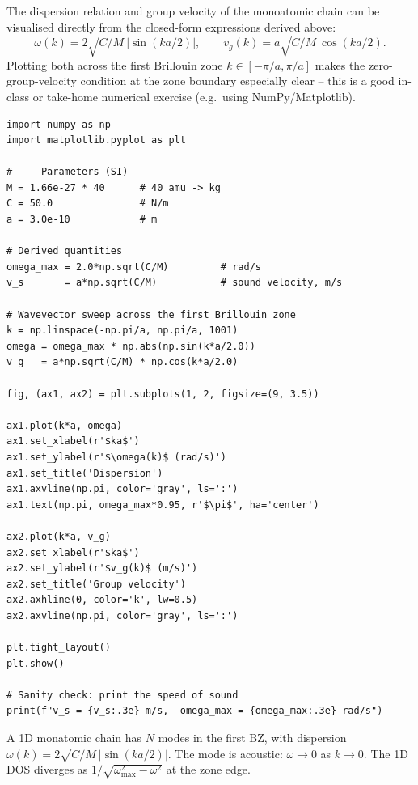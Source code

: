 \documentclass[11pt,a4paper]{article}
\begin{document}
The dispersion relation and group velocity of the monoatomic chain can be visualised
directly from the closed-form expressions derived above:
\[
\omega(k)=2\sqrt{C/M}\,|\sin(ka/2)|, \qquad v_g(k)=a\sqrt{C/M}\,\cos(ka/2).
\]
Plotting both across the first Brillouin zone $k\in[-\pi/a,\pi/a]$ makes the
zero-group-velocity condition at the zone boundary especially clear -- this is a good
in-class or take-home numerical exercise (e.g.\ using NumPy/Matplotlib).

\begin{pybox}
\begin{lstlisting}
import numpy as np
import matplotlib.pyplot as plt

# --- Parameters (SI) ---
M = 1.66e-27 * 40      # 40 amu -> kg
C = 50.0               # N/m
a = 3.0e-10            # m

# Derived quantities
omega_max = 2.0*np.sqrt(C/M)         # rad/s
v_s       = a*np.sqrt(C/M)           # sound velocity, m/s

# Wavevector sweep across the first Brillouin zone
k = np.linspace(-np.pi/a, np.pi/a, 1001)
omega = omega_max * np.abs(np.sin(k*a/2.0))
v_g   = a*np.sqrt(C/M) * np.cos(k*a/2.0)

fig, (ax1, ax2) = plt.subplots(1, 2, figsize=(9, 3.5))

ax1.plot(k*a, omega)
ax1.set_xlabel(r'$ka$')
ax1.set_ylabel(r'$\omega(k)$ (rad/s)')
ax1.set_title('Dispersion')
ax1.axvline(np.pi, color='gray', ls=':')
ax1.text(np.pi, omega_max*0.95, r'$\pi$', ha='center')

ax2.plot(k*a, v_g)
ax2.set_xlabel(r'$ka$')
ax2.set_ylabel(r'$v_g(k)$ (m/s)')
ax2.set_title('Group velocity')
ax2.axhline(0, color='k', lw=0.5)
ax2.axvline(np.pi, color='gray', ls=':')

plt.tight_layout()
plt.show()

# Sanity check: print the speed of sound
print(f"v_s = {v_s:.3e} m/s,  omega_max = {omega_max:.3e} rad/s")
\end{lstlisting}
\end{pybox}

\begin{takebox}
A 1D monatomic chain has $N$ modes in the first BZ, with dispersion
$\omega(k)=2\sqrt{C/M}\,|\sin(ka/2)|$. The mode is acoustic: $\omega\to0$ as $k\to0$.
The 1D DOS diverges as $1/\sqrt{\omega_{\max}^2-\omega^2}$ at the zone edge.
\end{takebox}
\end{document}
